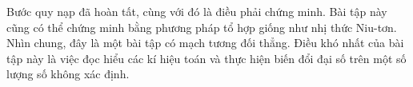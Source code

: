 Bước quy nạp đã hoàn tất, cùng với đó là điều phải chứng minh. Bài tập này cũng có thể chứng minh bằng phương pháp tổ hợp giống như nhị thức Niu-tơn. Nhìn chung, đây là một bài tập có mạch tương đối thẳng. Điều khó nhất của bài tập này là việc đọc hiểu các kí hiệu toán và thực hiện biến đổi đại số trên một số lượng số không xác định.

